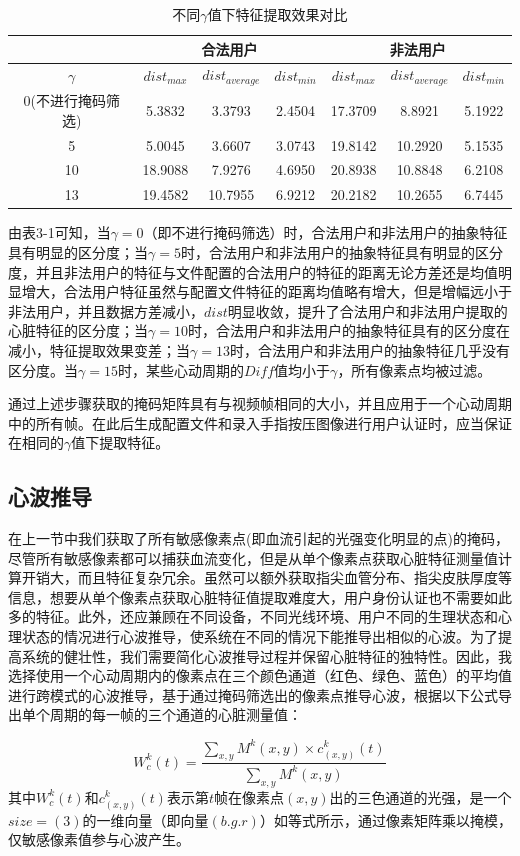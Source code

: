 \begin{table}[htbp]
  \linespread{1.5}
  \centering
  \caption{不同$\gamma$值下特征提取效果对比}\label{table5-1} 
  \begin{tabular}{c|c c c|c c c}
  \toprule
   &\multicolumn{3}{c|}{ 合法用户} &\multicolumn{3}{c}{ 非法用户}   \\
    \hline 
    $\gamma$ & $dist_{max}$ & $dist_{average}$ & $dist_{min}$  & $dist_{max}$ & $dist_{average}$ & $dist_{min}$ \\
    \hline
0(不进行掩码筛选)& 5.3832 &3.3793 &2.4504 &17.3709 &8.8921 &5.1922  \\ 
5& 5.0045 & 3.6607&3.0743 &19.8142 &10.2920 &5.1535 \\ 
10&18.9088  &7.9276 &4.6950 &20.8938 &10.8848 &6.2108 \\ 
13& 19.4582 &10.7955 &6.9212 &20.2182 &10.2655 &6.7445 \\  \bottomrule
    \end{tabular}
\end{table}
\par
{由表3-1可知，当$\gamma=0$（即不进行掩码筛选）时，合法用户和非法用户的抽象特征具有明显的区分度；当$\gamma=5$时，合法用户和非法用户的抽象特征具有明显的区分度，并且非法用户的特征与文件配置的合法用户的特征的距离无论方差还是均值明显增大，合法用户特征虽然与配置文件特征的距离均值略有增大，但是增幅远小于非法用户，并且数据方差减小，$dist$明显收敛，提升了合法用户和非法用户提取的心脏特征的区分度；当$\gamma=10$时，合法用户和非法用户的抽象特征具有的区分度在减小，特征提取效果变差；当$\gamma=13$时，合法用户和非法用户的抽象特征几乎没有区分度。当$\gamma=15$时，某些心动周期的$Diff$值均小于$\gamma$，所有像素点均被过滤。}
\par
{通过上述步骤获取的掩码矩阵具有与视频帧相同的大小，并且应用于一个心动周期中的所有帧。在此后生成配置文件和录入手指按压图像进行用户认证时，应当保证在相同的$\gamma$值下提取特征。}
\subsection{心波推导}
{在上一节中我们获取了所有敏感像素点(即血流引起的光强变化明显的点)的掩码，尽管所有敏感像素都可以捕获血流变化，但是从单个像素点获取心脏特征测量值计算开销大，而且特征复杂冗余。虽然可以额外获取指尖血管分布、指尖皮肤厚度等信息，想要从单个像素点获取心脏特征值提取难度大，用户身份认证也不需要如此多的特征。此外，还应兼顾在不同设备，不同光线环境、用户不同的生理状态和心理状态的情况进行心波推导，使系统在不同的情况下能推导出相似的心波。为了提高系统的健壮性，我们需要简化心波推导过程并保留心脏特征的独特性。因此，我选择使用一个心动周期内的像素点在三个颜色通道（红色、绿色、蓝色）的平均值进行跨模式的心波推导，基于通过掩码筛选出的像素点推导心波，根据以下公式导出单个周期的每一帧的三个通道的心脏测量值：}
\par
\begin{equation}
    W_c^k(t)=\frac{\sum_{x,y}{M^k(x,y)}\times c_{(x,y)}^k(t)}{ \sum_{x,y}{M^k(x,y)}}
\end{equation}
{
其中$ W_c^k(t)$和$ c_{(x,y)}^k(t)$表示第$t$帧在像素点$(x,y)$出的三色通道的光强，是一个$size=(3)$的一维向量（即向量$(b.g.r)$）如等式所示，通过像素矩阵乘以掩模，仅敏感像素值参与心波产生。
}
\par


